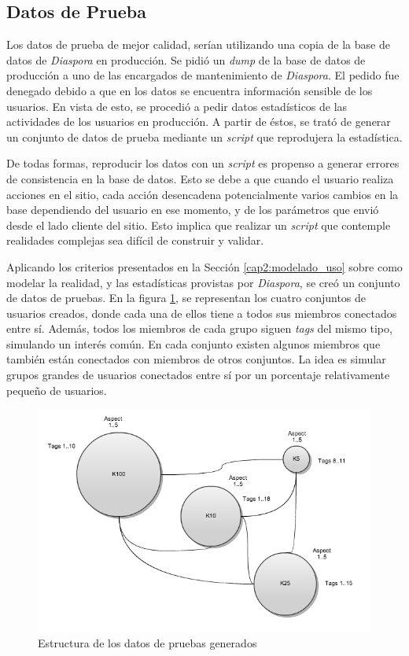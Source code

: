 \subsection{Datos de Prueba}

Los datos de prueba de mejor calidad, serían utilizando una copia de la base de datos de \emph{Diaspora} en producción. Se pidió un \emph{dump} de la base de datos de
producción a uno de las encargados de mantenimiento de \emph{Diaspora}. El pedido fue denegado debido a que en los datos se encuentra información sensible de los
usuarios. En vista de esto, se procedió a pedir datos estadísticos de las actividades de los usuarios en producción. A partir de éstos, se trató de 
generar un conjunto de datos de prueba mediante un \emph{script} que reprodujera la estadística.

De todas formas, reproducir los datos con un \emph{script} es propenso a generar errores de consistencia en la base de datos. Esto se debe a que cuando el usuario realiza
acciones en el sitio, cada acción desencadena potencialmente varios cambios en la base dependiendo del usuario en ese momento, y de los parámetros que envió desde
el lado cliente del sitio. Esto implica que realizar un \emph{script} que contemple realidades complejas sea difícil de construir y validar.

Aplicando los criterios presentados en la Sección \ref{cap2:modelado_uso} sobre como modelar la realidad, y las estadísticas provistas por \emph{Diaspora}, se creó un conjunto de 
datos de pruebas. En la figura \ref{fig.datos_de_prueba}, se representan los cuatro conjuntos de usuarios creados, donde cada una de ellos tiene a todos sus miembros 
conectados entre sí. Además, todos los miembros de cada grupo siguen \emph{tags} del mismo tipo, simulando un interés común. En cada conjunto existen 
algunos miembros que también están conectados con miembros de otros conjuntos. La idea es simular grupos grandes de usuarios conectados entre sí por un porcentaje 
relativamente pequeño de usuarios. 

\begin{figure}[h!]
\centering
\includegraphics[scale=0.5]{figuras/figura_datos_prueba.png}
  \caption{Estructura de los datos de pruebas generados}
    \label{fig.datos_de_prueba}
\end{figure}

